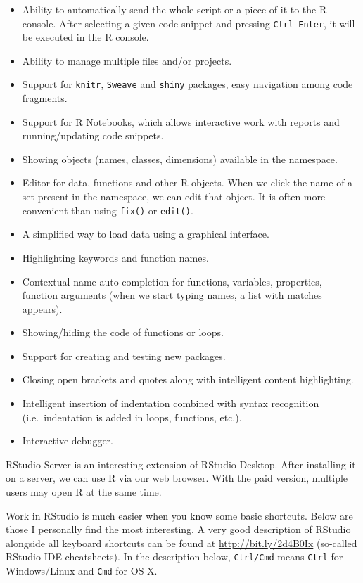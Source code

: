 \documentclass[]{book}
\theoremstyle{definition}
\theoremstyle{definition}
\theoremstyle{definition}
\theoremstyle{remark}
\begin{document}
\begin{itemize}
\item
  Ability to automatically send the whole script or a piece of it to the
  R console. After selecting a given code snippet and pressing
  \texttt{Ctrl-Enter}, it will be executed in the R console.
\item
  Ability to manage multiple files and/or projects.
\item
  Support for \texttt{knitr}, \texttt{Sweave} and \texttt{shiny}
  packages, easy navigation among code fragments.
\item
  Support for R Notebooks, which allows interactive work with reports
  and running/updating code snippets.
\item
  Showing objects (names, classes, dimensions) available in the
  namespace.
\item
  Editor for data, functions and other R objects. When we click the name
  of a set present in the namespace, we can edit that object. It is
  often more convenient than using \texttt{fix()} or \texttt{edit()}.
\item
  A simplified way to load data using a graphical interface.
\item
  Highlighting keywords and function names.
\item
  Contextual name auto-completion for functions, variables, properties,
  function arguments (when we start typing names, a list with matches
  appears).
\item
  Showing/hiding the code of functions or loops.
\item
  Support for creating and testing new packages.
\item
  Closing open brackets and quotes along with intelligent content
  highlighting.
\item
  Intelligent insertion of indentation combined with syntax recognition
  (i.e.~indentation is added in loops, functions, etc.).
\item
  Interactive debugger.
\end{itemize}

RStudio Server is an interesting extension of RStudio Desktop. After
installing it on a server, we can use R via our web browser. With the
paid version, multiple users may open R at the same time.

Work in RStudio is much easier when you know some basic shortcuts. Below
are those I personally find the most interesting. A very good
description of RStudio alongside all keyboard shortcuts can be found at
\url{http://bit.ly/2d4B0Ix} (so-called RStudio IDE cheatsheets). In the
description below, \texttt{Ctrl/Cmd} means \texttt{Ctrl} for
Windows/Linux and \texttt{Cmd} for OS X.
\end{document}
